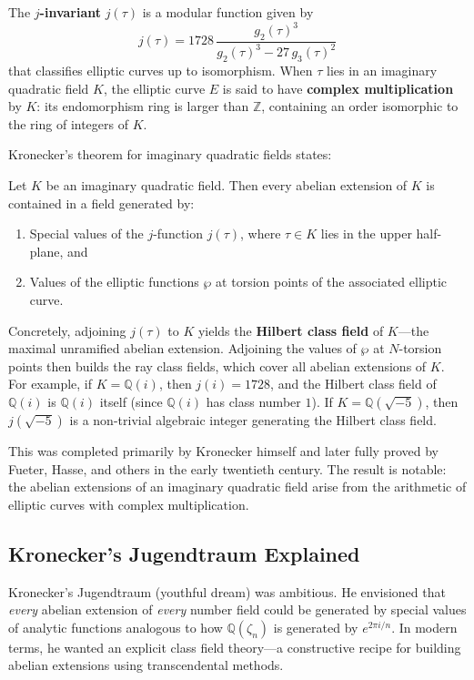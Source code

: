 The \textbf{$j$-invariant} $j(\tau)$ is a modular function given by
\[
j(\tau) = 1728\,\frac{g_2(\tau)^3}{g_2(\tau)^3 - 27\,g_3(\tau)^2}
\]
that classifies elliptic curves up to isomorphism. When $\tau$ lies in an imaginary quadratic field $K$, the elliptic curve $E$ is said to have \textbf{complex multiplication} by $K$: its endomorphism ring is larger than $\mathbb{Z}$, containing an order isomorphic to the ring of integers of $K$.

Kronecker's theorem for imaginary quadratic fields states:

\begin{theorem}\label{thm:jugendtraum}
Let $K$ be an imaginary quadratic field. Then every abelian extension of $K$ is contained in a field generated by:
\begin{enumerate}
    \item Special values of the $j$-function $j(\tau)$, where $\tau \in K$ lies in the upper half-plane, and
    \item Values of the elliptic functions $\wp$ at torsion points of the associated elliptic curve.
\end{enumerate}
\end{theorem}

Concretely, adjoining $j(\tau)$ to $K$ yields the \textbf{Hilbert class field} of $K$---the maximal unramified abelian extension. Adjoining the values of $\wp$ at $N$-torsion points then builds the ray class fields, which cover all abelian extensions of $K$. For example, if $K = \mathbb{Q}(i)$, then $j(i) = 1728$, and the Hilbert class field of $\mathbb{Q}(i)$ is $\mathbb{Q}(i)$ itself (since $\mathbb{Q}(i)$ has class number $1$). If $K = \mathbb{Q}(\sqrt{-5})$, then $j(\sqrt{-5})$ is a non-trivial algebraic integer generating the Hilbert class field.

This was completed primarily by Kronecker himself and later fully proved by Fueter, Hasse, and others in the early twentieth century. The result is notable: the abelian extensions of an imaginary quadratic field arise from the arithmetic of elliptic curves with complex multiplication.

\subsection{Kronecker's Jugendtraum Explained}

Kronecker's Jugendtraum (youthful dream) was ambitious. He envisioned that \emph{every} abelian extension of \emph{every} number field could be generated by special values of analytic functions analogous to how $\mathbb{Q}(\zeta_n)$ is generated by $e^{2\pi i/n}$. In modern terms, he wanted an explicit class field theory---a constructive recipe for building abelian extensions using transcendental methods.

